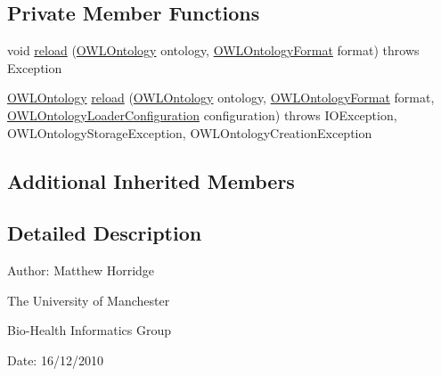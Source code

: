 \subsection*{Private Member Functions}
\begin{DoxyCompactItemize}
\item 
void \hyperlink{classorg_1_1semanticweb_1_1owlapi_1_1api_1_1test_1_1annotations_1_1_load_annotation_axioms_test_case_aea6a898b32e9a489d3be309c2c97f4e8}{reload} (\hyperlink{interfaceorg_1_1semanticweb_1_1owlapi_1_1model_1_1_o_w_l_ontology}{O\-W\-L\-Ontology} ontology, \hyperlink{classorg_1_1semanticweb_1_1owlapi_1_1model_1_1_o_w_l_ontology_format}{O\-W\-L\-Ontology\-Format} format)  throws Exception 
\item 
\hyperlink{interfaceorg_1_1semanticweb_1_1owlapi_1_1model_1_1_o_w_l_ontology}{O\-W\-L\-Ontology} \hyperlink{classorg_1_1semanticweb_1_1owlapi_1_1api_1_1test_1_1annotations_1_1_load_annotation_axioms_test_case_aa7fe0b75e942b5869bdeb35ff009ab8b}{reload} (\hyperlink{interfaceorg_1_1semanticweb_1_1owlapi_1_1model_1_1_o_w_l_ontology}{O\-W\-L\-Ontology} ontology, \hyperlink{classorg_1_1semanticweb_1_1owlapi_1_1model_1_1_o_w_l_ontology_format}{O\-W\-L\-Ontology\-Format} format, \hyperlink{classorg_1_1semanticweb_1_1owlapi_1_1model_1_1_o_w_l_ontology_loader_configuration}{O\-W\-L\-Ontology\-Loader\-Configuration} configuration)  throws I\-O\-Exception,             O\-W\-L\-Ontology\-Storage\-Exception, O\-W\-L\-Ontology\-Creation\-Exception 
\end{DoxyCompactItemize}
\subsection*{Additional Inherited Members}


\subsection{Detailed Description}
Author\-: Matthew Horridge\par
 The University of Manchester\par
 Bio-\/\-Health Informatics Group\par
 Date\-: 16/12/2010 

